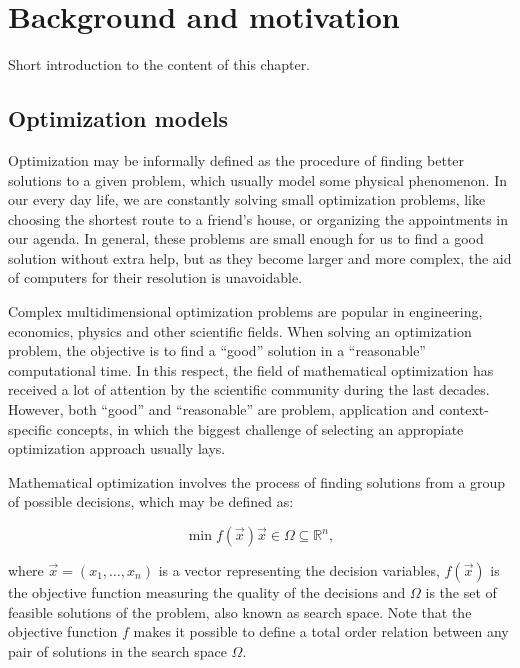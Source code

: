 
\chapter{Background and motivation \label{chap:Background-and-motivation}}


\noindent Short introduction to the content of this chapter.


\section{Optimization models}

Optimization may be informally defined as the procedure of finding
better solutions to a given problem, which usually model some physical
phenomenon. In our every day life, we are constantly solving small
optimization problems, like choosing the shortest route to a friend's
house, or organizing the appointments in our agenda. In general, these
problems are small enough for us to find a good solution without extra
help, but as they become larger and more complex, the aid of computers
for their resolution is unavoidable.

Complex multidimensional optimization problems are popular in engineering,
economics, physics and other scientific fields. When solving an optimization
problem, the objective is to find a ``good'' solution in a ``reasonable''
computational time. In this respect, the field of mathematical optimization
has received a lot of attention by the scientific community during
the last decades. However, both ``good'' and ``reasonable'' are
problem, application and context-specific concepts, in which the biggest
challenge of selecting an appropiate optimization approach usually
lays.

Mathematical optimization involves the process of finding solutions
from a group of possible decisions, which may be defined as:

\begin{equation}
\min f(\vec{x})\vec{x}\in\Omega\subseteq\mathbb{R}^{n},
\end{equation}


\noindent where $\vec{x}=(x_{1},\dots,x_{n})$ is a vector representing
the decision variables, $f(\vec{x})$ is the objective function measuring
the quality of the decisions and $\Omega$ is the set of feasible
solutions of the problem, also known as search space. Note that the
objective function $f$ makes it possible to define a total order
relation between any pair of solutions in the search space $\Omega$.

